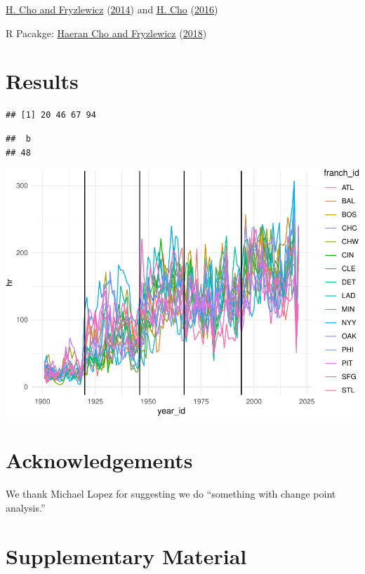 \documentclass[
  12pt,
]{article}
\begin{document}
\protect\hyperlink{ref-ChoFryzlewwicz2014}{H. Cho and Fryzlewicz}
(\protect\hyperlink{ref-ChoFryzlewwicz2014}{2014}) and
\protect\hyperlink{ref-Cho2016}{H. Cho}
(\protect\hyperlink{ref-Cho2016}{2016})

R Pacakge: \protect\hyperlink{ref-hdbinseg}{Haeran Cho and Fryzlewicz}
(\protect\hyperlink{ref-hdbinseg}{2018})

\hypertarget{results}{%
\section{Results}\label{results}}

\begin{verbatim}
## [1] 20 46 67 94
\end{verbatim}

\begin{verbatim}
##  b 
## 48
\end{verbatim}

\begin{center}\includegraphics{paper_files/figure-latex/unnamed-chunk-1-1} \end{center}

\hypertarget{acknowledgements}{%
\section*{Acknowledgements}\label{acknowledgements}}

We thank Michael Lopez for suggesting we do ``something with change
point analysis.''

\hypertarget{supplementary-material}{%
\section*{Supplementary Material}\label{supplementary-material}}
\end{document}
